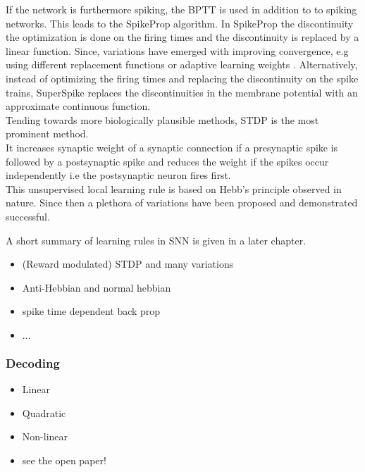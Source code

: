 	If the network is furthermore spiking, the \ac{BPTT} is used in addition to  to spiking networks. This leads to the SpikeProp\cite{bohte_spikeprop_2000} algorithm. In SpikeProp the discontinuity the optimization is done on the firing times and the discontinuity is replaced by a linear function. Since, variations have emerged with improving convergence\cite{mckennoch_fast_2006}, e.g using different replacement functions \cite{thiruvarudchelvan_analysis_2013}\cite{neftci_surrogate_2019} or adaptive learning weights \cite{shrestha_adaptive_2015}.
	Alternatively, instead of optimizing the firing times and replacing the discontinuity on the spike trains, SuperSpike\cite{zenke_superspike_2018} replaces the discontinuities in the membrane potential with an approximate continuous function.\\
	Tending towards more biologically plausible methods, \ac{STDP} is the most prominent method.\\
	It increases synaptic weight of a synaptic connection if a presynaptic spike is followed by a postsynaptic spike and reduces the weight if the spikes occur independently i.e the postsynaptic neuron fires first.\\
	This unsupervised local learning rule is based on Hebb's principle observed in nature. Since then a plethora of variations have been proposed and demonstrated successful.



	A short summary of learning rules in \ac{SNN} is given in a later chapter.\\



	\begin{itemize}
	\item (Reward modulated) STDP and many variations
	\item Anti-Hebbian and normal hebbian
	\item spike time dependent back prop
	\item $\dots$
	\end{itemize}


\subsubsection{Decoding}
	\begin{itemize}
	\item Linear
	\item Quadratic
	\item Non-linear
	\item see the open paper!
	\end{itemize}



